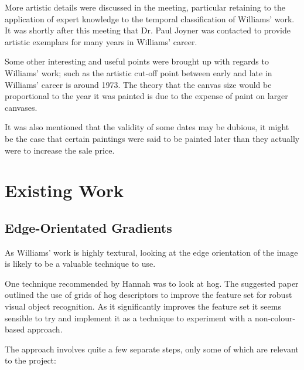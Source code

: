 More artistic details were discussed in the meeting, particular retaining to the application of
expert knowledge to the temporal classification of Williams' work. It was shortly after this 
meeting that Dr. Paul Joyner was contacted to provide artistic exemplars for many years in 
Williams' career.

Some other interesting and useful points were brought up with regards to Williams' work; such as the artistic cut-off 
point between early and late in Williams' career is around 1973. The theory that the canvas size
would be proportional to the year it was painted is due to the expense of paint on larger 
canvases.

It was also mentioned that the validity of some dates may be dubious, it might be the case that 
certain paintings were said to be painted later than they actually were to increase the sale price.


\section{Existing Work}

\subsection{Edge-Orientated Gradients}\label{sec:existing-hogs}
As Williams' work is highly textural, looking at the edge orientation of the image is
likely to be a valuable technique to use.

One technique recommended by Hannah was to look at \gls{hog}. The suggested paper outlined the use
of grids of \gls{hog} descriptors to improve the feature set for robust visual object
recognition\cite{Dalal2005Histograms}. As it significantly improves the feature set it seems
sensible to try and implement it as a technique to experiment with a non-colour-based approach.

The approach involves quite a few separate steps, only some of which are relevant to the project:

